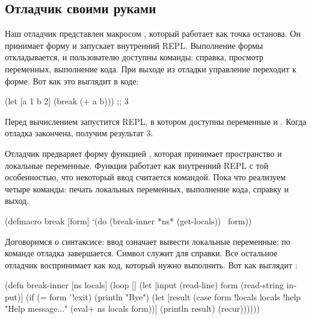 \subsection{Отладчик своими руками}

Наш отладчик представлен макросом , который работает как точка останова. Он принимает форму и запускает внутренний REPL. Выполнение формы откладывается, и пользователю доступны команды: справка, просмотр переменных, выполнение кода. При выходе из отладки управление переходит к форме. Вот как это выглядит в коде:

\begin{english}
  \begin{clojure}
(let [a 1
      b 2]
  (break (+ a b)))
;; 3
  \end{clojure}
\end{english}

Перед вычислением  запустится REPL, в котором доступны переменные  и . Когда отладка закончена, получим результат 3.

Отладчик предваряет форму функцией , которая принимает пространство и локальные переменные. Функция  работает как внутренний REPL с той особенностью, что некоторый ввод считается командой. Пока что реализуем четыре команды: печать локальных переменных, выполнение кода, справку и выход.

\begin{english}
  \begin{clojure}
(defmacro break [form]
  `(do
     (break-inner *ns* (get-locals))
     ~form))
  \end{clojure}
\end{english}

Договоримся о синтаксисе: ввод  означает вывести локальные переменные; по команде  отладка завершается. Символ  служит для справки. Все остальное отладчик воспринимает как код, который нужно выполнить. Вот как выглядит :

\begin{english}
  \begin{clojure}
(defn break-inner [ns locals]
  (loop []
    (let [input (read-line)
          form (read-string input)]
      (if (= form '!exit)
        (println "Bye")
        (let [result
              (case form
                !locals locals
                !help "Help message..."
                (eval+ ns locals form))]
          (println result)
          (recur))))))
  \end{clojure}
\end{english}

